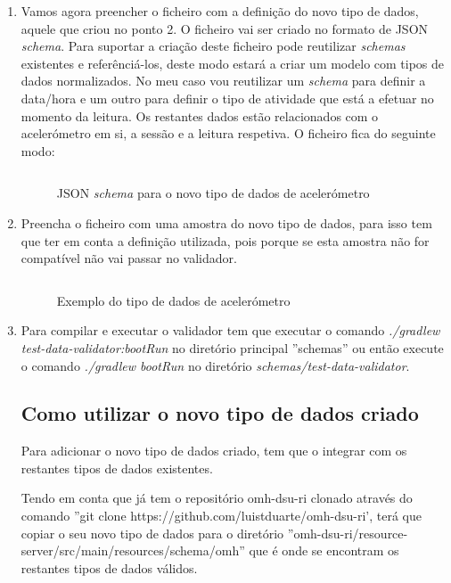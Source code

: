 \begin{enumerate}
\begin{figure}[!ht]
  \label{f:directorynewsample}
\end{figure}
  
\item Vamos agora preencher o ficheiro com a definição do novo tipo de dados, aquele que criou no ponto 2. O ficheiro vai ser criado no formato de \gls{JSON} \textit{schema}. Para suportar a criação deste ficheiro pode reutilizar \textit{schemas} existentes \cite{schema-library} e referênciá-los, deste modo estará a criar um modelo com tipos de dados normalizados. No meu caso vou reutilizar um \textit{schema} para definir a data/hora e um outro para definir o tipo de atividade que está a efetuar no momento da leitura. Os restantes dados estão relacionados com o acelerómetro em si, a sessão e a leitura respetiva.
O ficheiro fica do seguinte modo: 

\begin{figure}[H]
\inputminted[fontsize=\scriptsize]{json}{code/accelerometer-1.0.json}
\caption[\gls{JSON} \textit{schema} para o novo tipo de dados de acelerómetro]{\gls{JSON} \textit{schema} para o novo tipo de dados de acelerómetro}
\label{f:accelerometer-json-schema}
\end{figure}

\item Preencha o ficheiro com uma amostra do novo tipo de dados, para isso tem que ter em conta a definição utilizada, pois porque se esta amostra não for compatível não vai passar no validador.

\begin{figure}[H]
\inputminted[fontsize=\scriptsize]{json}{code/example.json}
\caption[Exemplo do tipo de dados de acelerómetro]{Exemplo do tipo de dados de acelerómetro}
\label{f:accelerometer-json-data}
\end{figure}

\item Para compilar e executar o validador tem que executar o comando \textit{./gradlew test-data-validator:bootRun} no diretório principal ''schemas'' ou então execute o comando \textit{./gradlew bootRun} no diretório \textit{schemas/test-data-validator}. 

\subsection{Como utilizar o novo tipo de dados criado}

Para adicionar o novo tipo de dados criado, tem que o integrar com os restantes tipos de dados existentes. \par Tendo em conta que já tem o repositório omh-dsu-ri clonado através do comando ''git clone https://github.com/luistduarte/omh-dsu-ri', terá que copiar o seu novo tipo de dados para o diretório ''omh-dsu-ri/resource-server/src/main/resources/schema/omh'' que é onde se encontram os restantes tipos de dados válidos.

\end{enumerate}

\cleardoublepage
